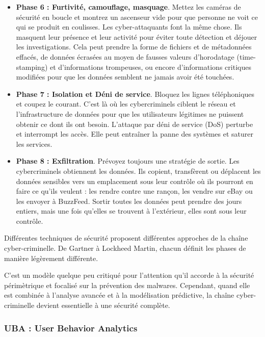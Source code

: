 \begin{itemize}
 \item \textbf{Phase 6 :  Furtivité, camouflage, masquage}. Mettez les caméras de sécurité en boucle et montrez un ascenseur vide pour que personne ne voit ce qui se produit en coulisses. Les cyber-attaquants font la même chose. Ils masquent leur présence et leur activité pour éviter toute détection et déjouer les investigations. Cela peut prendre la forme de fichiers et de métadonnées effacés, de données écrasées au moyen de fausses valeurs d’horodatage (time-stamping) et d’informations trompeuses, ou encore d’informations critiques modifiées pour que les données semblent ne jamais avoir été touchées.

 \item \textbf{Phase 7 :  Isolation et Déni de service}. Bloquez les lignes téléphoniques et coupez le courant. C’est là où les cybercriminels ciblent le réseau et l’infrastructure de données pour que les utilisateurs légitimes ne puissent obtenir ce dont ils ont besoin. L’attaque par déni de service (DoS) perturbe et interrompt les accès. Elle peut entraîner la panne des systèmes et saturer les services.

 \item \textbf{Phase 8 :  Exfiltration}. Prévoyez toujours une stratégie de sortie. Les cybercriminels obtiennent les données. Ils copient, transfèrent ou déplacent les données sensibles vers un emplacement sous leur contrôle où ils pourront en faire ce qu’ils veulent : les rendre contre une rançon, les vendre sur eBay ou les envoyer à BuzzFeed. Sortir toutes les données peut prendre des jours entiers, mais une fois qu’elles se trouvent à l’extérieur, elles sont sous leur contrôle.

\end{itemize}

Différentes techniques de sécurité proposent différentes approches de la chaîne cyber-criminelle. De Gartner à Lockheed Martin, chacun définit les phases de manière légèrement différente.

C’est un modèle quelque peu critiqué pour l’attention qu’il accorde à la sécurité  périmètrique et focalisé sur la prévention des malwares. Cependant, quand elle est combinée à l’analyse avancée et à la modélisation prédictive, la chaîne cyber-criminelle devient essentielle à une sécurité complète.

\subsubsection{UBA : User Behavior Analytics}

